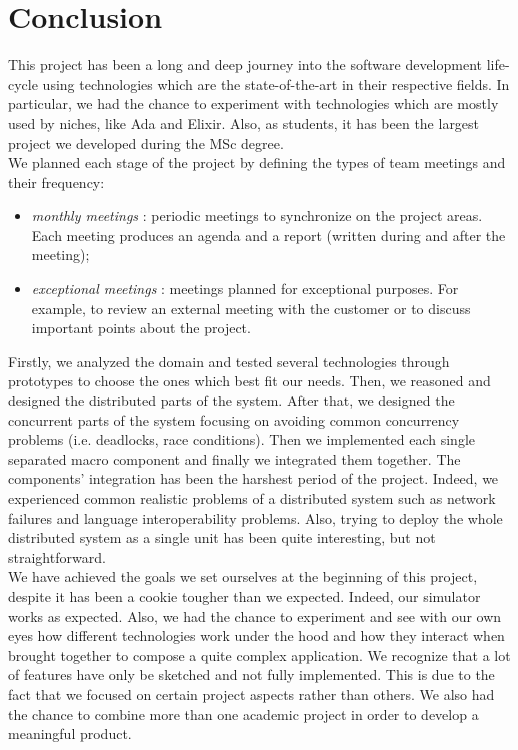 \section{Conclusion}



This project has been a long and deep journey into the software development life-cycle
using technologies which are the state-of-the-art in their respective fields.
In particular, we had the chance to experiment
with technologies which are mostly used by
niches, like Ada and Elixir.
Also, as students, it has been the largest project we developed during the MSc degree.
\\

We planned each stage of the project by defining the
types of team meetings and their frequency:
\begin{itemize}
	\item \textit{monthly meetings} : periodic meetings to synchronize on the
	project areas. Each meeting produces an agenda and a report
	(written during and after the meeting);
	\item \textit{exceptional meetings} : meetings planned
	for exceptional purposes.
	For example, to review an external meeting with the customer
	or to discuss important points about the project.
\end{itemize}

Firstly, we analyzed the domain and tested several technologies through
prototypes to choose the ones which best fit our needs.
Then, we reasoned and designed the distributed parts of the system.
After that, we designed the concurrent parts of the system focusing
on avoiding common concurrency problems (i.e. deadlocks, race conditions).
Then we implemented each single separated macro component
and finally we integrated
them together. The components' integration has been
the harshest period of the project.
Indeed, we experienced common realistic problems of
a distributed system such as network failures and language interoperability
problems. Also, trying to deploy the whole distributed system as a single unit
has been quite interesting, but not straightforward.
\\

We have achieved the goals we set ourselves at the beginning of this
project, despite it has been a cookie tougher than we expected.
Indeed, our simulator works as expected. Also, we had the chance to experiment
and see with our own eyes how different technologies work under the hood and
how they interact when brought
together to compose a quite complex application.
We recognize that a lot of features have only be sketched and not fully
implemented. This is due to the fact that we focused on certain project aspects
rather than others.
We also had the chance to combine more than one academic project in order to
develop a meaningful product.
\\


